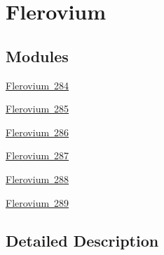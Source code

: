 \hypertarget{group___isotope_const-_flerovium}{}\section{Flerovium}
\label{group___isotope_const-_flerovium}
\subsection*{Modules}
\begin{DoxyCompactItemize}
\item 
\mbox{\hyperlink{group___isotope_const-_flerovium-_fl284}{Flerovium 284}}
\item 
\mbox{\hyperlink{group___isotope_const-_flerovium-_fl285}{Flerovium 285}}
\item 
\mbox{\hyperlink{group___isotope_const-_flerovium-_fl286}{Flerovium 286}}
\item 
\mbox{\hyperlink{group___isotope_const-_flerovium-_fl287}{Flerovium 287}}
\item 
\mbox{\hyperlink{group___isotope_const-_flerovium-_fl288}{Flerovium 288}}
\item 
\mbox{\hyperlink{group___isotope_const-_flerovium-_fl289}{Flerovium 289}}
\end{DoxyCompactItemize}


\subsection{Detailed Description}

